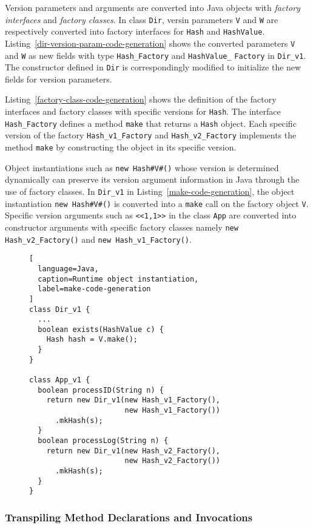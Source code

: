 Version parameters and arguments are converted into Java objects with \emph{factory interfaces} and 
\emph{factory classes}. In class \texttt{Dir}, versin parameters \texttt{V} and \texttt{W} are respectively converted into 
factory interfaces for \texttt{Hash} and \texttt{HashValue}. Listing~\ref{dir-version-param-code-generation} 
shows the converted parameters \texttt{V} and \texttt{W} as new fields with type \texttt{Hash\_Factory} and 
\texttt{HashValue\_} \texttt{Factory} in \texttt{Dir\_v1}. 
The constructor defined in \texttt{Dir} is correspondingly modified to initialize the new fields for version parameters.

Listing~\ref{factory-class-code-generation} shows the definition of the factory interfaces and factory classes 
with specific versions for \texttt{Hash}. The interface \texttt{Hash\_Factory} defines a method \texttt{make} 
that returns a \texttt{Hash} object. Each specific version of the factory \texttt{Hash\_v1\_Factory} and 
\texttt{Hash\_v2\_Factory} implements the method \texttt{make} by constructing the object in its specific version.

Object instantiations such as \texttt{new Hash\#V\#()} whose version is determined dynamically 
can preserve its version argument information in Java through the use of factory classes. 
In \texttt{Dir\_v1} in Listing~\ref{make-code-generation}, the object instantiation \texttt{new Hash\#V\#()} is 
converted into a \texttt{make} call on the factory object \texttt{V}. 
Specific version arguments such as \texttt{<<1,1>>} in the class \texttt{App} are converted into 
constructor arguments with specific factory classes namely \texttt{new Hash\_v2\_Factory()} and 
\texttt{new Hash\_v1\_Factory()}.

\begin{figure}[t]
\begin{lstlisting}[
  language=Java,
  caption=Runtime object instantiation,
  label=make-code-generation
]
class Dir_v1 {
  ...
  boolean exists(HashValue c) {
    Hash hash = V.make();
  }
}

class App_v1 {
  boolean processID(String n) {
    return new Dir_v1(new Hash_v1_Factory(),
                      new Hash_v1_Factory())
      .mkHash(s);
  }
  boolean processLog(String n) {
    return new Dir_v1(new Hash_v2_Factory(), 
                      new Hash_v2_Factory())
      .mkHash(s);
  }
}
\end{lstlisting}
\end{figure}

\subsubsection*{Transpiling Method Declarations and Invocations}

